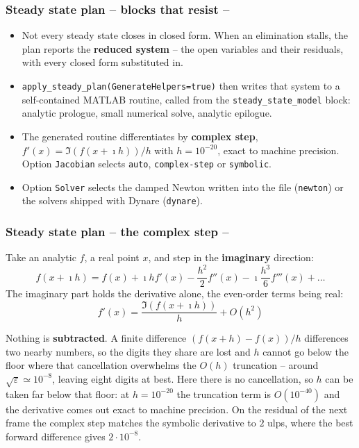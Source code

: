 \documentclass[10pt,slidestop]{beamer}
\theoremstyle{plain}
\begin{document}
\begin{frame}[c,fragile]
  \frametitle{Steady state plan -- blocks that resist --}

  \begin{itemize}

  \item Not every steady state closes in closed form. When an elimination
    stalls, the plan reports the \textbf{reduced system} -- the open variables
    and their residuals, with every closed form substituted in.\newline

  \item \verb+apply_steady_plan(GenerateHelpers=true)+ then writes that system
    to a self-contained MATLAB routine, called from the
    \verb+steady_state_model+ block: analytic prologue, small numerical solve,
    analytic epilogue.\newline

  \item The generated routine differentiates by \textbf{complex step},
    $f'(x)=\Im\left(f(x+\imath h)\right)/h$ with $h=10^{-20}$, exact to machine
    precision. Option \verb+Jacobian+ selects \verb+auto+, \verb+complex-step+
    or \verb+symbolic+.\newline

  \item Option \verb+Solver+ selects the damped Newton written into the file
    (\verb+newton+) or the solvers shipped with Dynare (\verb+dynare+).

  \end{itemize}

\end{frame}


\begin{frame}[c,fragile]
  \frametitle{Steady state plan -- the complex step --}

  Take an analytic $f$, a real point $x$, and step in the \textbf{imaginary}
  direction:
  \[
    f(x+\imath h) = f(x) + \imath h f'(x) - \frac{h^2}{2}f''(x)
    - \imath\frac{h^3}{6}f'''(x) + \dots
  \]
  The imaginary part holds the derivative alone, the even-order terms being real:
  \[
    \boxed{\;f'(x) = \frac{\Im\left(f(x+\imath h)\right)}{h} + O(h^2)\;}
  \]

  \medskip
  \small Nothing is \textbf{subtracted}. A finite difference $(f(x+h)-f(x))/h$
  differences two nearby numbers, so the digits they share are lost and $h$ cannot go
  below the floor where that cancellation overwhelms the $O(h)$ truncation -- around
  $\sqrt{\varepsilon}\simeq 10^{-8}$, leaving eight digits at best. Here there is no
  cancellation, so $h$ can be taken far below that floor: at $h=10^{-20}$ the
  truncation term is $O(10^{-40})$ and the derivative comes out exact to machine
  precision. On the residual of the next frame the complex step matches the symbolic
  derivative to $2$ ulps, where the best forward difference gives $2\cdot 10^{-8}$.

\end{frame}
\end{document}
